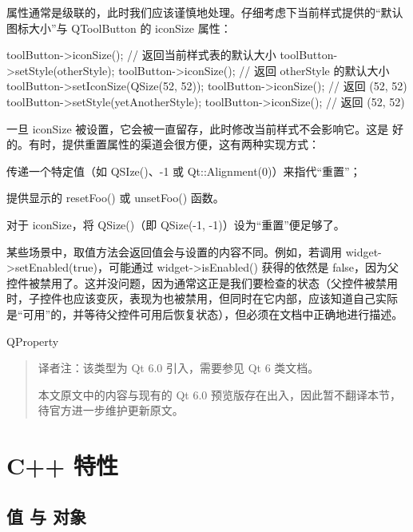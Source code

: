 属性通常是级联的，此时我们应该谨慎地处理。仔细考虑下当前样式提供的“默认图标大小”与 QToolButton 的 iconSize 属性：

\begin{cppcode}
toolButton->iconSize(); // 返回当前样式表的默认大小
toolButton->setStyle(otherStyle);
toolButton->iconSize(); // 返回 otherStyle 的默认大小
toolButton->setIconSize(QSize(52, 52));
toolButton->iconSize(); // 返回 (52, 52)
toolButton->setStyle(yetAnotherStyle);
toolButton->iconSize(); // 返回 (52, 52) 
\end{cppcode}


\begin{notice}
	一旦 iconSize 被设置，它会被一直留存，此时修改当前样式不会影响它。这是 好的。有时，提供重置属性的渠道会很方便，这有两种实现方式：

\end{notice}

\begin{compactitem}
	\item 传递一个特定值（如 QSIze()、-1 或 Qt::Alignment(0)）来指代“重置”；
	\item 提供显示的 resetFoo() 或 unsetFoo() 函数。
\end{compactitem}

对于 iconSize，将 QSize()（即 QSize(-1, -1)）设为“重置”便足够了。

某些场景中，取值方法会返回值会与设置的内容不同。例如，若调用 widget->setEnabled(true)，可能通过 widget->isEnabled() 获得的依然是 false，因为父控件被禁用了。这并没问题，因为通常这正是我们要检查的状态（父控件被禁用时，子控件也应该变灰，表现为也被禁用，但同时在它内部，应该知道自己实际是“可用”的，并等待父控件可用后恢复状态），但必须在文档中正确地进行描述。

QProperty

\begin{quote}
译者注：该类型为 Qt 6.0 引入，需要参见 Qt 6 类文档。

本文原文中的内容与现有的 Qt 6.0 预览版存在出入，因此暂不翻译本节，待官方进一步维护更新原文。
\end{quote}

\section{C++ 特性}

\subsection{值 与 对象}


